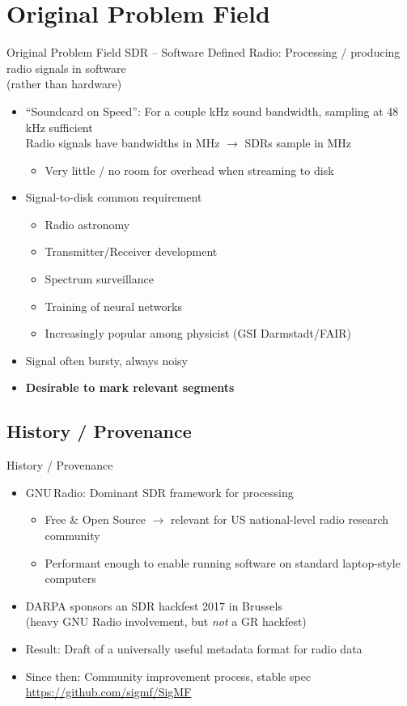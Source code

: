 \section{Original Problem Field}
\begin{frame}{Original Problem Field}
  SDR -- Software Defined Radio: Processing / producing radio signals in software\\(rather than hardware)
  \begin{itemize}
    \item ``Soundcard on Speed'': For a couple kHz sound bandwidth, sampling at 48\,kHz sufficient\\
      Radio signals have bandwidths in MHz $\rightarrow$ SDRs sample in MHz
      \begin{itemize}
        \item Very little / no room for overhead when streaming to disk
      \end{itemize}
    \item Signal-to-disk common requirement
      \begin{itemize}
        \item Radio astronomy
        \item Transmitter/Receiver development
        \item Spectrum surveillance
        \item Training of neural networks
        \item Increasingly popular among physicist (GSI Darmstadt/FAIR)
      \end{itemize}
    \item Signal often bursty, always noisy
    \item \textbf<2>{Desirable to mark relevant segments}
  \end{itemize}
\end{frame}

\subsection{History / Provenance}
\begin{frame}{History / Provenance}
  \begin{itemize}
    \item GNU\,Radio: Dominant SDR framework for processing
      \begin{itemize}
        \item Free \& Open Source $\rightarrow$ relevant for US national-level radio research community
        \item Performant enough to enable running software on standard laptop-style computers
      \end{itemize}
    \item DARPA sponsors an SDR hackfest 2017 in Brussels\\
      (heavy GNU Radio involvement, but \emph{not} a GR hackfest)
    \item Result: Draft of a universally useful metadata format for radio data
    \item Since then: Community improvement process, stable spec \url{https://github.com/sigmf/SigMF}
  \end{itemize}
\end{frame}


